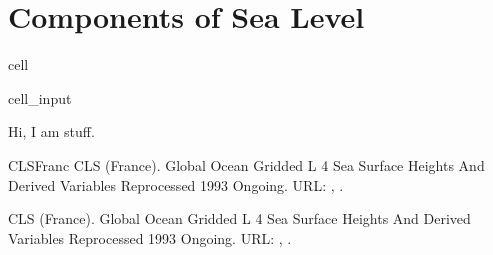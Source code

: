 \documentclass[letterpaper,10pt,english]{jupyterBook}
\begin{document}
\part{Components of Sea Level}
\label{\detokenize{notebooks/regional_and_local/SL_Components_annual:components-of-sea-level}}\label{\detokenize{notebooks/regional_and_local/SL_Components_annual::doc}}
\begin{sphinxuseclass}{cell}\begin{sphinxVerbatimInput}

\begin{sphinxuseclass}{cell_input}
\begin{sphinxVerbatim}[commandchars=\\\{\}]
\end{sphinxVerbatim}

\end{sphinxuseclass}\end{sphinxVerbatimInput}

\end{sphinxuseclass}
\sphinxAtStartPar
Hi, I am stuff.

\begin{sphinxthebibliography}{CLSFranc}
\sphinxAtStartPar
CLS (France). Global Ocean Gridded L 4 Sea Surface Heights And Derived Variables Reprocessed 1993 Ongoing. URL: , .

\sphinxAtStartPar
CLS (France). Global Ocean Gridded L 4 Sea Surface Heights And Derived Variables Reprocessed 1993 Ongoing. URL: , .
\end{sphinxthebibliography}







\renewcommand{\indexname}{Index}
\printindex
\end{document}

